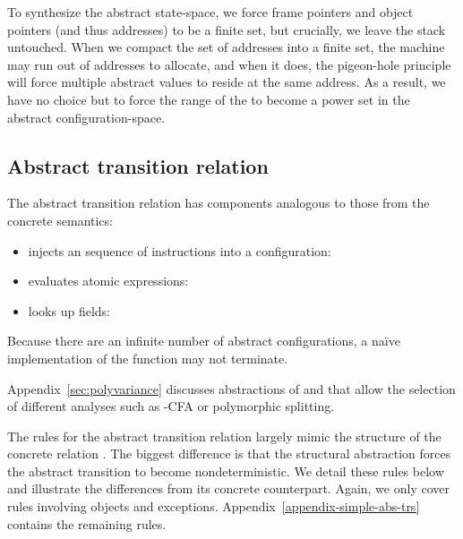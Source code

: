  
 
To synthesize the abstract state-space,
we force frame pointers and object pointers (and thus addresses) to be a finite set, 
but crucially, we leave the stack untouched. 
When we compact the set of addresses into a finite set, 
the machine may run out of addresses to allocate, and when it does, 
the pigeon-hole principle will force multiple abstract values to reside at the same address. 
As a result, we have no choice but to force the range of the  to become a power set 
in the abstract configuration-space. 


\subsection{Abstract transition relation} \label{sec:abs-transition-rules}

The abstract transition relation has components analogous to those from the concrete semantics:



\begin{itemize}

\item
 injects an sequence of instructions into
                                              a configuration:
 


\item
 evaluates atomic expressions:
  

\item

looks up fields:
  


\end{itemize}
      Because there are an infinite number of abstract configurations, a
      na\"ive implementation of the  function may not terminate.

Appendix~\ref{sec:polyvariance} discusses abstractions of  and
 that allow the selection of different analyses such as -CFA or
polymorphic splitting.

 The rules for the abstract transition relation  
    largely mimic the structure of the concrete relation .
The biggest difference is that the structural abstraction 
forces the abstract transition to become nondeterministic.
We detail these rules below and illustrate the 
 differences from its concrete counterpart. 
 Again, we only cover rules involving objects and exceptions. 
 Appendix~\ref{appendix-simple-abs-trs} contains the remaining rules.






